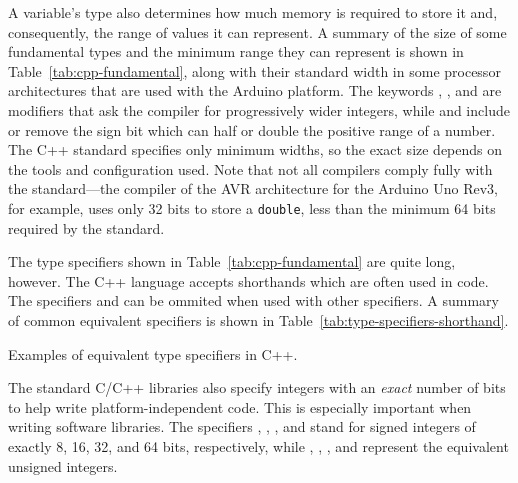 A variable's type also determines how much memory is required to store it and, consequently, the range of values it can represent.
A summary of the size of some fundamental types and the minimum range they can represent is shown in Table~\ref{tab:cpp-fundamental}, along with their standard width in some processor architectures that are used with the Arduino platform.
The keywords , , and  are modifiers that ask the compiler for progressively wider integers, while  and  include or remove the sign bit which can half or double the positive range of a number. 
The C++ standard specifies only minimum widths, so the exact size depends on the tools and configuration used.
Note that not all compilers comply fully with the standard---the compiler of the AVR architecture for the Arduino Uno Rev3, for example, uses only 32 bits to store a \texttt{double}, less than the minimum 64 bits required by the standard.

The type specifiers shown in Table~\ref{tab:cpp-fundamental} are quite long, however.
The C++ language accepts shorthands which are often used in code.
The specifiers  and  can be ommited when used with other specifiers.
A summary of common equivalent specifiers is shown in Table~\ref{tab:type-specifiers-shorthand}.

\begin{table}
  \centering
  \caption{Examples of equivalent type specifiers in C++.}
  \label{tab:type-specifiers-shorthand}
\end{table}

The standard C/C++ libraries also specify integers with an \emph{exact} number of bits to help write platform-independent code.
This is especially important when writing software libraries.
The specifiers , , , and  stand for signed integers of exactly \num{8}, \num{16}, \num{32}, and \num{64} bits, respectively, while , , , and  represent the equivalent unsigned integers.

